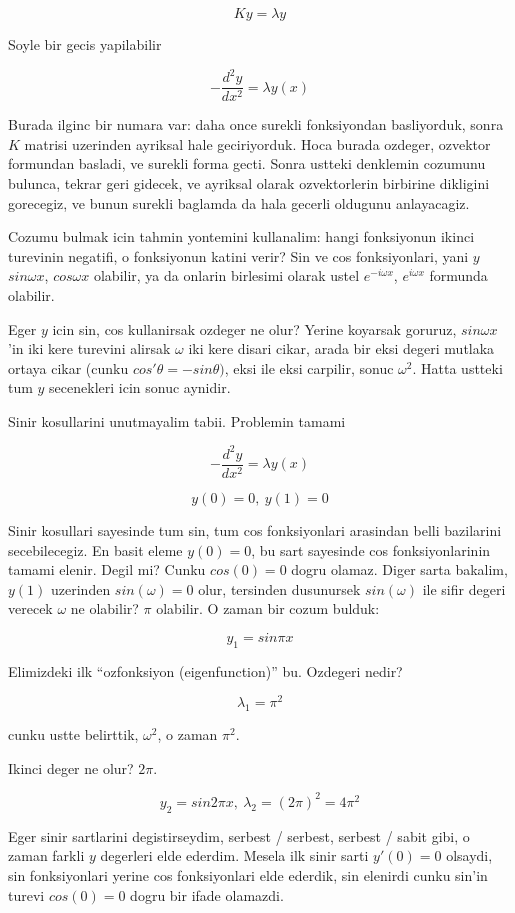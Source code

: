 \documentclass[12pt,fleqn]{article}\usepackage{../common}
\begin{document}
\[ Ky = \lambda y \]

Soyle bir gecis yapilabilir

\[ -\frac{d^2y}{dx^2} = \lambda y(x) \]

Burada ilginc bir numara var: daha once surekli fonksiyondan basliyorduk,
sonra $K$ matrisi uzerinden ayriksal hale geciriyorduk. Hoca burada
ozdeger, ozvektor formundan basladi, ve surekli forma gecti. Sonra ustteki
denklemin cozumunu bulunca, tekrar geri gidecek, ve ayriksal olarak
ozvektorlerin birbirine dikligini gorecegiz, ve bunun surekli baglamda da
hala gecerli oldugunu anlayacagiz. 

Cozumu bulmak icin tahmin yontemini kullanalim: hangi fonksiyonun ikinci
turevinin negatifi, o fonksiyonun katini verir? Sin ve cos fonksiyonlari,
yani $y$ $sin \omega x$, $cos \omega x$ olabilir, ya da onlarin birlesimi
olarak ustel $e^{-i\omega x}$, $e^{i\omega x}$ formunda olabilir.

Eger $y$ icin sin, cos kullanirsak ozdeger ne olur? Yerine koyarsak
goruruz, $sin\omega x$'in iki kere turevini alirsak $\omega$ iki kere
disari cikar, arada bir eksi degeri mutlaka ortaya cikar (cunku 
$cos'\theta =
-sin\theta)$, eksi ile eksi carpilir, sonuc $\omega^2$. Hatta ustteki tum
$y$ secenekleri icin sonuc aynidir. 
 
Sinir kosullarini unutmayalim tabii. Problemin tamami

\[ -\frac{d^2y}{dx^2} = \lambda y(x) \]

\[ y(0) = 0, \ y(1) = 0 \]

Sinir kosullari sayesinde tum sin, tum cos fonksiyonlari arasindan belli
bazilarini secebilecegiz. En basit eleme $y(0) = 0$, bu sart sayesinde cos
fonksiyonlarinin tamami elenir. Degil mi? Cunku $cos(0) = 0$ dogru
olamaz. Diger sarta bakalim, $y(1)$ uzerinden $sin(\omega) = 0$ olur,
tersinden dusunursek $sin(\omega)$ ile sifir degeri verecek $\omega$ ne
olabilir? $\pi$ olabilir. O zaman bir cozum bulduk:

\[ y_1 = sin \pi x \]

Elimizdeki ilk ``ozfonksiyon (eigenfunction)'' bu. Ozdegeri nedir?

\[ \lambda_1 = \pi^2 \]

cunku ustte belirttik, $\omega^2$, o zaman $\pi^2$. 

Ikinci deger ne olur? $2\pi$. 

\[ y_2 = sin2\pi x, \ \lambda_2 = (2\pi)^2 = 4\pi^2 \]

Eger sinir sartlarini degistirseydim, serbest / serbest, serbest / sabit
gibi, o zaman farkli $y$ degerleri elde ederdim. Mesela ilk sinir sarti
$y'(0) = 0$ olsaydi, sin fonksiyonlari yerine cos fonksiyonlari elde
ederdik, sin elenirdi cunku sin'in turevi $cos(0) = 0$ dogru bir ifade
olamazdi. 
\end{document}
